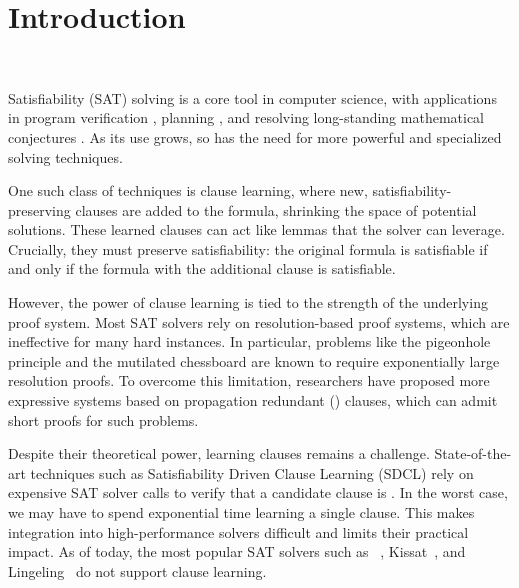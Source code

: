 \section{Introduction}~\label{sec:intro}


Satisfiability (SAT) solving is a core tool in computer science, with applications in program verification \cite{BillionQueries}, planning \cite{planning}, and resolving long-standing mathematical conjectures \cite{chromaticnumber}. As its use grows, so has the need for more powerful and specialized solving techniques.

One such class of techniques is clause learning, where new, satisfiability-preserving clauses are added to the formula, shrinking the space of potential solutions. These learned clauses can act like lemmas that the solver can leverage. Crucially, they must preserve satisfiability: the original formula is satisfiable if and only if the formula with the additional clause is satisfiable.



However, the power of clause learning is tied to the strength of the underlying proof system. Most SAT solvers rely on resolution-based proof systems, which are ineffective for many hard instances. In particular, problems like the pigeonhole principle and the mutilated chessboard are known to require exponentially large resolution proofs. To overcome this limitation, researchers have proposed more expressive systems based on propagation redundant (\pr) clauses, which can admit short proofs for such problems.

Despite their theoretical power, learning \pr clauses remains a challenge. State-of-the-art techniques such as Satisfiability Driven Clause Learning (SDCL) rely on expensive SAT solver calls to verify that a candidate clause is \pr \cite{sadical}. In the worst case, we may have to spend exponential time learning a single \pr clause. This makes integration into high-performance solvers difficult and limits their practical impact. As of today, the most popular SAT solvers such as \cadical~\cite{cadical}, Kissat~\cite{kissat}, and Lingeling~\cite{lingeling} do not support \pr clause learning.

